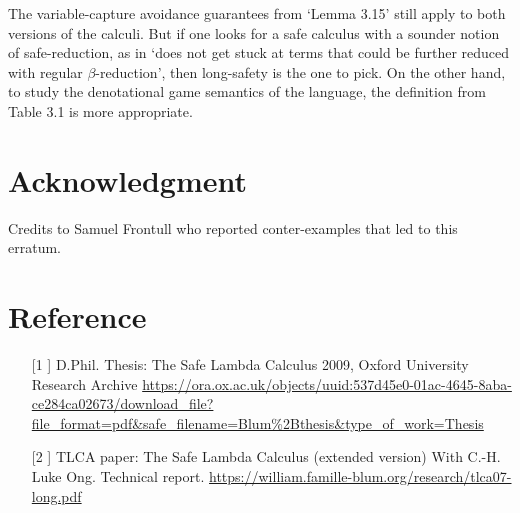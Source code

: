 \documentclass[12pt]{article}
\begin{document}
\begin{enumerate}
The variable-capture avoidance guarantees from `Lemma 3.15' still apply to both versions of the calculi. But if one looks for a safe calculus with a sounder notion of safe-reduction, as in `does not get stuck at terms that could be further reduced with regular $\beta$-reduction', then long-safety is the one to pick. On the other hand, to study the denotational game semantics of the language, the definition from Table 3.1 is more appropriate.

\end{enumerate}

\section{Acknowledgment}
Credits to Samuel Frontull who reported conter-examples that led to this erratum.

\section{Reference}

\begin{itemize}
    \item[[1]] D.Phil. Thesis: The Safe Lambda Calculus 2009, Oxford University Research Archive
    \url{https://ora.ox.ac.uk/objects/uuid:537d45e0-01ac-4645-8aba-ce284ca02673/download_file?file_format=pdf&safe_filename=Blum%2Bthesis&type_of_work=Thesis}

    \item[[2]] TLCA paper: The Safe Lambda Calculus (extended version) With C.-H. Luke Ong. Technical report. \url{https://william.famille-blum.org/research/tlca07-long.pdf}

\end{itemize}
\end{document}
